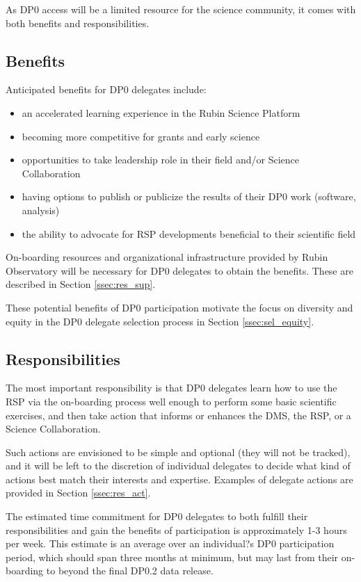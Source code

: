\documentclass[DM,authoryear,toc]{lsstdoc}
\begin{document}
As DP0 access will be a limited resource for the science community, it comes with both benefits and responsibilities.

\subsection{Benefits}\label{ssec:del_bene}

Anticipated benefits for DP0 delegates include:
\begin{itemize}
\item an accelerated learning experience in the Rubin Science Platform
\item becoming more competitive for grants and early science
\item opportunities to take leadership role in their field and/or Science Collaboration
\item having options to publish or publicize the results of their DP0 work (software, analysis)
\item the ability to advocate for RSP developments beneficial to their scientific field
\end{itemize}

On-boarding resources and organizational infrastructure provided by Rubin Observatory will be necessary for DP0 delegates to obtain the benefits. These are described in Section \ref{ssec:res_sup}.

These potential benefits of DP0 participation motivate the focus on diversity and equity in the DP0 delegate selection process in Section \ref{ssec:sel_equity}.

\subsection{Responsibilities}\label{ssec:del_resp}

The most important responsibility is that DP0 delegates learn how to use the RSP via the on-boarding process well enough to perform some basic scientific exercises, and then take action that informs or enhances the DMS, the RSP, or a Science Collaboration. 

Such actions are envisioned to be simple and optional (they will not be tracked), and it will be left to the discretion of individual delegates to decide what kind of actions best match their interests and expertise.
Examples of delegate actions are provided in Section \ref{ssec:res_act}.

The estimated time commitment for DP0 delegates to both fulfill their responsibilities and gain the benefits of participation is approximately 1-3 hours per week.
This estimate is an average over an individual?s DP0 participation period, which should span three months at minimum, but may last from their on-boarding to beyond the final DP0.2 data release.
\end{document}

